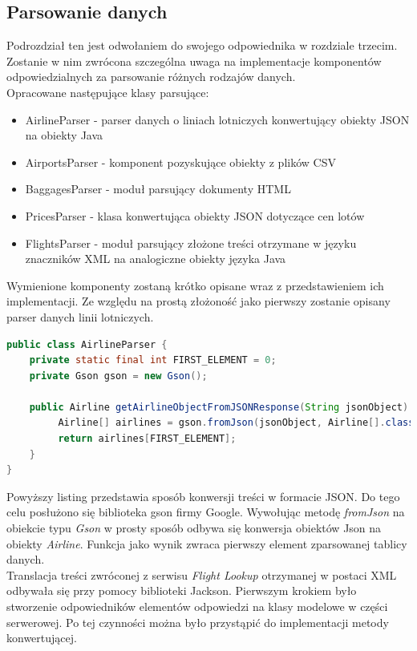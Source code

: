 \documentclass[12pt, twoside]{report}
\begin{document}
\subsection{Parsowanie danych}
Podrozdział ten jest odwołaniem do swojego odpowiednika w rozdziale trzecim. Zostanie w nim zwrócona szczególna uwaga na implementacje komponentów odpowiedzialnych za parsowanie różnych rodzajów danych.\\ \noindent
Opracowane następujące klasy parsujące:
\begin{itemize}[noitemsep,topsep=0pt]
\item AirlineParser - parser danych o liniach lotniczych konwertujący obiekty JSON na obiekty Java
\item AirportsParser - komponent pozyskujące obiekty z plików CSV
\item BaggagesParser - moduł parsujący dokumenty HTML
\item PricesParser - klasa konwertująca obiekty JSON dotyczące cen lotów
\item FlightsParser - moduł parsujący złożone treści otrzymane w języku znaczników XML na analogiczne obiekty języka Java
\end{itemize}
Wymienione komponenty zostaną krótko opisane wraz z przedstawieniem ich implementacji.
Ze względu na prostą złożoność jako pierwszy zostanie opisany parser danych linii lotniczych.
\begin{lstlisting}[language=java, caption=Implementacja parsowania treści JSON]
public class AirlineParser {
    private static final int FIRST_ELEMENT = 0;
    private Gson gson = new Gson();

    public Airline getAirlineObjectFromJSONResponse(String jsonObject) {
         Airline[] airlines = gson.fromJson(jsonObject, Airline[].class);
         return airlines[FIRST_ELEMENT];
    }
}
\end{lstlisting}
Powyższy listing przedstawia sposób konwersji treści w formacie JSON. Do tego celu posłużono się biblioteka gson firmy Google. Wywołując metodę \textit{fromJson} na obiekcie typu \textit{Gson} w prosty sposób odbywa się konwersja obiektów Json na obiekty \textit{Airline}. Funkcja jako wynik zwraca pierwszy element zparsowanej tablicy danych.\\ \indent
Translacja treści zwróconej z serwisu \textit{Flight Lookup} otrzymanej w postaci XML odbywała się przy pomocy biblioteki Jackson. Pierwszym krokiem było stworzenie odpowiedników elementów odpowiedzi na klasy modelowe w części serwerowej. Po tej czynności można było przystąpić do implementacji metody konwertującej.
\end{document}
